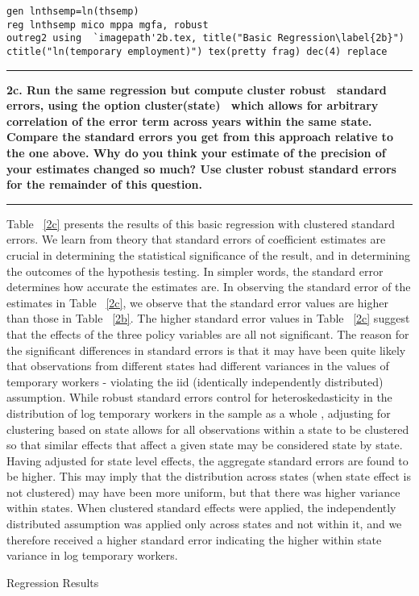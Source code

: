 \documentclass[12pt]{article}
\newcommand\question[1]{\vspace{1em}\hrule\vspace{1em}\textbf{#1}\vspace{1em}\hrule\vspace{1em}}
\begin{document}
\begin{lstlisting}
gen lnthsemp=ln(thsemp)
reg lnthsemp mico mppa mgfa, robust
outreg2 using  `imagepath'2b.tex, title("Basic Regression\label{2b}") ctitle("ln(temporary employment)") tex(pretty frag) dec(4) replace
\end{lstlisting}


\begin{table}
\caption{}

\end{table}

\newpage
\question{2c. Run the same regression but compute \textquotesingle cluster robust \textquotesingle \ standard errors, using the option \textquotesingle cluster(state) \textquotesingle \ which allows for arbitrary correlation of the error term across years within the same state. Compare the standard errors you get from this approach relative to the one above. Why do you think your estimate of the precision of your estimates changed so much? Use cluster robust standard errors for the remainder of this question.}


\noindent Table ~\ref{2c} presents the results of this basic regression with clustered standard errors. We learn from theory that standard errors of coefficient estimates are crucial in determining the statistical significance of the result, and in determining the outcomes of the hypothesis testing. In simpler words, the standard error determines how accurate the estimates are. In observing the standard error of the estimates in Table ~\ref{2c}, we observe that the standard error values are higher than those in Table ~\ref{2b}. The higher standard error values in Table ~\ref{2c} suggest that the effects of the three policy variables are all not significant. The reason for the significant differences in standard errors is that it may have been quite likely that observations from different states had different variances in the values of temporary workers - violating the iid  (identically independently distributed) assumption. While robust standard errors control for heteroskedasticity in the distribution of log temporary workers in the sample as a whole , adjusting for clustering based on state allows for all observations within a state to be clustered so that similar effects that affect a given state may be considered state by state. Having adjusted for state level effects, the aggregate standard errors are found to be higher. This may imply that the distribution across states (when state effect is not clustered) may have been more uniform, but that there was higher variance within states. When clustered standard effects were applied, the independently distributed assumption was applied only across states and not within it, and we therefore received a higher standard error indicating the higher within state variance in log temporary workers.
\begin{table}
\caption{Regression Results}

\end{table}
\end{document}
